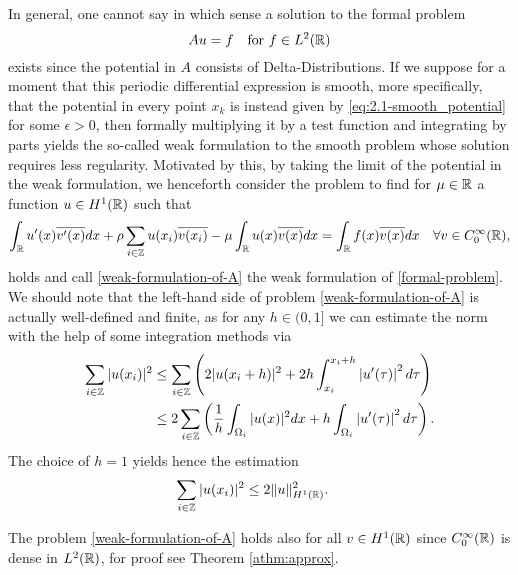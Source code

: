In general, one cannot say in which sense a solution to the formal problem 
	\begin{equation}
		Au = f \quad \text{for } f \in L^{2}(\mathbb{R}) \label{formal-problem}
	\end{equation}
	exists since the potential in $A$ consists of Delta-Distributions. If we suppose for a moment that this periodic differential expression is smooth, more specifically, that the potential in every point $x_{k}$ is instead given by \eqref{eq:2.1-smooth_potential} for some $\epsilon > 0$, then formally multiplying it by a test function and integrating by parts yields the so-called weak formulation to the smooth problem whose solution requires less regularity. Motivated by this, by taking the limit of the potential in the weak formulation, we henceforth consider the problem to find for $\mu \in \mathbb{R}$ a function $u \in H^{1}(\mathbb{R})$ such that
\begin{equation}
	\int_{\mathbb{R}} u'(x) \overline{v'(x)} dx + \rho \sum_{i \in \mathbb{Z}} u(x_{i}) \overline{v(x_{i})} - \mu \int_{\mathbb{R}} u(x) \overline{v(x)} dx = \int_{\mathbb{R}} f(x) \overline{v(x)} dx \quad \forall v \in C_{0}^{\infty}(\mathbb{R}), \label{weak-formulation-of-A}
\end{equation}	
holds and call \eqref{weak-formulation-of-A} the weak formulation of \eqref{formal-problem}. We should note that the left-hand side of problem \eqref{weak-formulation-of-A} is actually well-defined and finite, as for any $h \in (0, 1]$ we can estimate the norm with the help of some integration methods via
\begin{align}
	\sum_{i \in \mathbb{Z}} |u(x_{i})|^{2} & \leq \sum_{i \in \mathbb{Z}} \left( 2 |u( x_{i} + h )|^{2} +  2 h \int_{x_{i}}^{x_{i} + h} \left| u'(\tau) \right|^{2} d\tau \right) \notag \\
		 & \leq 2 \sum_{i \in \mathbb{Z}} \left( \frac{1}{h} \int_{\Omega_{i}} |u( x )|^{2} dx + h \int_{\Omega_{i}} \left| u'(\tau) \right|^{2} d\tau \right). \label{preestimation-for-potential}
\end{align}
The choice of $h = 1$ yields hence the estimation
\begin{align} 
		\sum_{i \in \mathbb{Z}} |u(x_{i})|^{2} & \leq 2 \| u \|^{2}_{H^{1}(\mathbb{R})}. \label{estimation-for-potential}
\end{align}

\begin{remark}
	The problem \eqref{weak-formulation-of-A} holds also for all $v \in H^{1}(\mathbb{R})$ since $C_{0}^{\infty}(\mathbb{R})$ is dense in $L^{2}(\mathbb{R})$, for proof see Theorem \ref{athm:approx}.
\end{remark}

